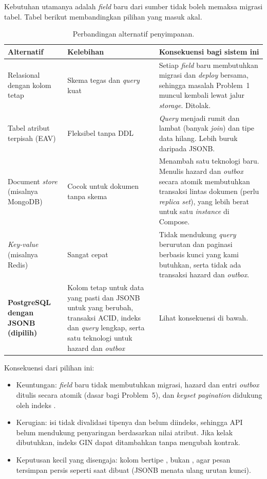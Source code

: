 Kebutuhan utamanya adalah \emph{field} baru dari sumber tidak boleh memaksa migrasi tabel. Tabel berikut membandingkan pilihan
yang masuk akal.

\begin{table}[H]
\centering\small
\begin{tabularx}{\textwidth}{@{}L{3.1cm}YY@{}}
\toprule
\textbf{Alternatif} & \textbf{Kelebihan} & \textbf{Konsekuensi bagi sistem ini}\\
\midrule
Relasional dengan kolom tetap & Skema tegas dan \emph{query} kuat & Setiap \emph{field} baru membutuhkan migrasi dan \emph{deploy} bersama, sehingga masalah Problem~1 muncul kembali lewat jalur \emph{storage}. Ditolak.\\
Tabel atribut terpisah (EAV) & Fleksibel tanpa DDL & \emph{Query} menjadi rumit dan lambat (banyak \emph{join}) dan tipe data hilang. Lebih buruk daripada JSONB.\\
Document \emph{store} (misalnya MongoDB) & Cocok untuk dokumen tanpa skema & Menambah satu teknologi baru. Menulis hazard dan \emph{outbox} secara atomik membutuhkan transaksi lintas dokumen (perlu \emph{replica set}), yang lebih berat untuk satu \emph{instance} di Compose.\\
\emph{Key-value} (misalnya Redis) & Sangat cepat & Tidak mendukung \emph{query} berurutan dan paginasi berbasis kunci yang kami butuhkan, serta tidak ada transaksi hazard dan \emph{outbox}.\\
\textbf{PostgreSQL dengan JSONB (dipilih)} & Kolom tetap untuk data yang pasti dan JSONB untuk yang berubah, transaksi ACID, indeks dan \emph{query} lengkap, serta satu teknologi untuk hazard dan \emph{outbox} & Lihat konsekuensi di bawah.\\
\bottomrule
\end{tabularx}
\caption{Perbandingan alternatif penyimpanan.}
\end{table}

Konsekuensi dari pilihan ini:
\begin{itemize}
 \item Keuntungan: \emph{field} baru tidak membutuhkan migrasi, hazard dan entri \emph{outbox} ditulis secara atomik (dasar bagi Problem~5), dan \emph{keyset pagination} didukung oleh indeks .
 \item Kerugian: isi  tidak divalidasi tipenya dan belum diindeks, sehingga API belum mendukung penyaringan berdasarkan nilai atribut. Jika kelak dibutuhkan, indeks GIN dapat ditambahkan tanpa mengubah kontrak.
 \item Keputusan kecil yang disengaja: kolom  bertipe , bukan , agar pesan tersimpan persis seperti saat dibuat (JSONB menata ulang urutan kunci).
\end{itemize}

